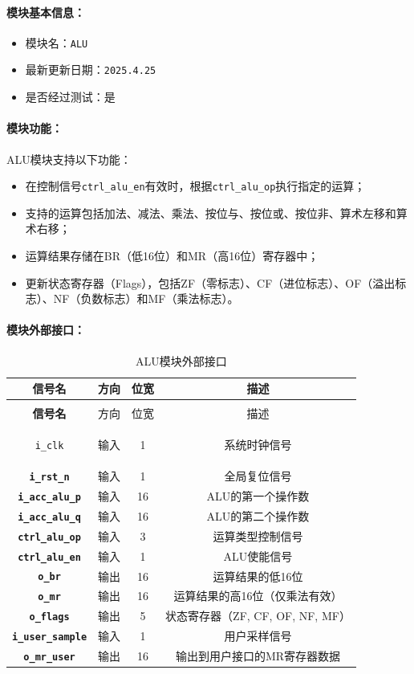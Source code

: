 \documentclass[lang=cn,a4paper,newtx]{elegantpaper}
\begin{document}
\paragraph{模块基本信息：}
\begin{itemize}
  \item 模块名：\texttt{ALU}
  \item 最新更新日期：\texttt{2025.4.25}
  \item 是否经过测试：是
\end{itemize}

\paragraph{模块功能：}
ALU模块支持以下功能：
\begin{itemize}
  \item 在控制信号\texttt{ctrl\_alu\_en}有效时，根据\texttt{ctrl\_alu\_op}执行指定的运算；
  \item 支持的运算包括加法、减法、乘法、按位与、按位或、按位非、算术左移和算术右移；
  \item 运算结果存储在BR（低16位）和MR（高16位）寄存器中；
  \item 更新状态寄存器（Flags），包括ZF（零标志）、CF（进位标志）、OF（溢出标志）、NF（负数标志）和MF（乘法标志）。
\end{itemize}

\paragraph{模块外部接口：}
\begin{longtable}{>{\bfseries}c c c c}
  \caption{ALU模块外部接口} \\ 
  \toprule
  信号名 & 方向 & 位宽 & 描述 \\ 
  \midrule
  \endfirsthead

  \multicolumn{4}{l}{\textbf{（续表）ALU模块外部接口}} \\ 
  \toprule
  信号名 & 方向 & 位宽 & 描述 \\ 
  \midrule
  \endhead

  \texttt{i\_clk} & 输入 & 1 & 系统时钟信号 \\ 
  \texttt{i\_rst\_n} & 输入 & 1 & 全局复位信号 \\ 
  \texttt{i\_acc\_alu\_p} & 输入 & 16 & ALU的第一个操作数 \\ 
  \texttt{i\_acc\_alu\_q} & 输入 & 16 & ALU的第二个操作数 \\ 
  \texttt{ctrl\_alu\_op} & 输入 & 3 & 运算类型控制信号 \\ 
  \texttt{ctrl\_alu\_en} & 输入 & 1 & ALU使能信号 \\ 
  \texttt{o\_br} & 输出 & 16 & 运算结果的低16位 \\ 
  \texttt{o\_mr} & 输出 & 16 & 运算结果的高16位（仅乘法有效） \\ 
  \texttt{o\_flags} & 输出 & 5 & 状态寄存器（ZF, CF, OF, NF, MF） \\ 
  \texttt{i\_user\_sample} & 输入 & 1 & 用户采样信号 \\ 
  \texttt{o\_mr\_user} & 输出 & 16 & 输出到用户接口的MR寄存器数据 \\ 
  \bottomrule
\end{longtable}
\end{document}
